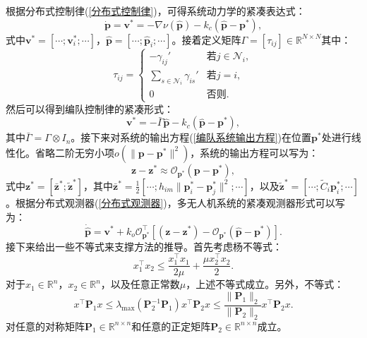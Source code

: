 根据分布式控制律(\ref{分布式控制律})，可得系统动力学的紧凑表达式：
\begin{equation}
	\dot{\mathbf{p}} = \mathbf{v}^* = 
	-\nabla \nu (\hat{\mathbf{p}}) - k_c(\hat{\mathbf{p}}-\mathbf{p}^*),
	\label{系统动力学紧凑表达式}
\end{equation}
式中$\mathbf{v}^*=[\cdots;\mathbf{v}_i^*;\cdots]$，$\hat{\mathbf{p}}=[\cdots;\hat{\mathbf{p}}_i;\cdots]$。接着定义矩阵$\Gamma = [\tau_{ij}] \in \mathbb{R}^{N \times N}$其中：
\begin{equation}
	\tau_{ij} =
	\begin{cases}
		-\gamma_{ij}' & \text{若}j \in \mathcal{N}_i, \\
		\sum_{s \in \mathcal{N}_i} \gamma_{is}' & \text{若}j = i, \\
		0 & \text{否则}.
	\end{cases}
\end{equation}
然后可以得到编队控制律的紧凑形式：
\begin{equation}
	\mathbf{v}^*=-\bar{\Gamma} \hat{\mathbf{p}} -k_c(\hat{\mathbf{p}}-\mathbf{p}^*),
\end{equation}
其中$\bar{\Gamma} = \Gamma \otimes I_n$。接下来对系统的输出方程(\ref{编队系统输出方程})在位置$\mathbf{p}^*$处进行线性化。省略二阶无穷小项$o (\|\mathbf{p}-\mathbf{p}^*\|^2)$，系统的输出方程可以写为：
\begin{equation}
	\mathbf{z}-\mathbf{z}^* \approx 
	\mathcal{O}_{\mathbf{p}^*}(\mathbf{p}-\mathbf{p}^*),
	\label{系统输出方程线性化}
\end{equation}
式中${\mathbf{z}}^*=[\bar{\mathbf{z}}^*;\tilde{\mathbf{z}}^*]$，其中$\bar{\mathbf{z}}^*=\frac{1}{2}[\cdots;h_{im}\|\mathbf{p}_i^*-\mathbf{p}_j^*\|^2;\cdots]$，以及$\tilde{\mathbf{z}}^*=[\cdots;\tilde{C}_i \mathbf{p}_i^*;\cdots]$。根据分布式观测器(\ref{分布式观测器})，多无人机系统的紧凑观测器形式可以写为：
\begin{equation}
	\dot{\hat{\mathbf{p}}} = 
	\mathbf{v}^* + k_o \mathcal{O}_{\mathbf{p}^*}^\top 
	[(\mathbf{z}-\mathbf{z}^*) -
	\mathcal{O}_{\mathbf{p}^*}(\hat{\mathbf{p}}-\mathbf{p}^*)].
	\label{紧凑观测器形式}
\end{equation}
接下来给出一些不等式来支撑方法的推导。首先考虑杨不等式\cite{1934Inequalities}：
\begin{equation}
	x_1^\top x_2 \le \frac{x_1^\top x_1}{2\mu} + \frac{\mu x_2^\top x_2}{2}.
	\label{杨不等式}
\end{equation}
对于$x_1 \in \mathbb{R}^n$，$x_2 \in \mathbb{R}^n$，以及任意正常数$\mu$，上述不等式成立。另外，不等式\cite{wyman1994linear}：
\begin{equation}
	x^\top \mathbf{P}_1 x \le
	\lambda_\text{max}(\mathbf{P}_2^{-1} \mathbf{P}_1)x^\top \mathbf{P}_2 x \le
	\frac{\|\mathbf{P}_1\|_2}
	{\|\mathbf{P}_2\|_2}x^\top \mathbf{P}_2 x.
	\label{不等式1}
\end{equation}
对任意的对称矩阵$\mathbf{P}_1 \in \mathbb{R}^{n \times n}$和任意的正定矩阵$\mathbf{P}_2 \in \mathbb{R}^{n \times n}$成立。

